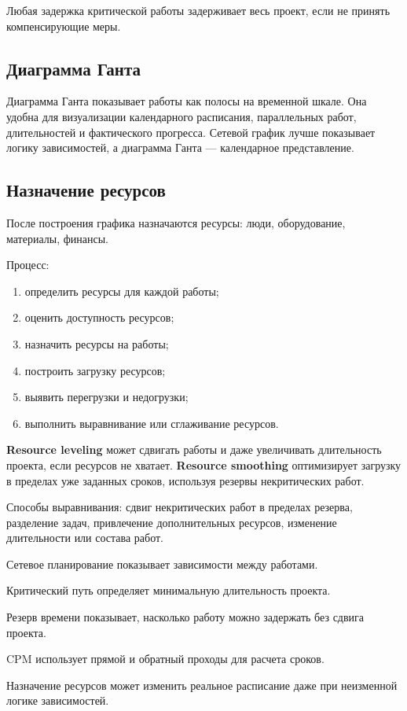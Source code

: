 Любая задержка критической работы задерживает весь проект, если не принять компенсирующие меры.

\subsection*{Диаграмма Ганта}

Диаграмма Ганта показывает работы как полосы на временной шкале. Она удобна для визуализации календарного расписания, параллельных работ, длительностей и фактического прогресса. Сетевой график лучше показывает логику зависимостей, а диаграмма Ганта --- календарное представление.

\subsection*{Назначение ресурсов}

После построения графика назначаются ресурсы: люди, оборудование, материалы, финансы.

Процесс:
\begin{enumerate}
    \item определить ресурсы для каждой работы;
    \item оценить доступность ресурсов;
    \item назначить ресурсы на работы;
    \item построить загрузку ресурсов;
    \item выявить перегрузки и недогрузки;
    \item выполнить выравнивание или сглаживание ресурсов.
\end{enumerate}

\textbf{Resource leveling} может сдвигать работы и даже увеличивать длительность проекта, если ресурсов не хватает. \textbf{Resource smoothing} оптимизирует загрузку в пределах уже заданных сроков, используя резервы некритических работ.

Способы выравнивания: сдвиг некритических работ в пределах резерва, разделение задач, привлечение дополнительных ресурсов, изменение длительности или состава работ.

\begin{important}
    \item Сетевое планирование показывает зависимости между работами.
    \item Критический путь определяет минимальную длительность проекта.
    \item Резерв времени показывает, насколько работу можно задержать без сдвига проекта.
    \item CPM использует прямой и обратный проходы для расчета сроков.
    \item Назначение ресурсов может изменить реальное расписание даже при неизменной логике зависимостей.
\end{important}
